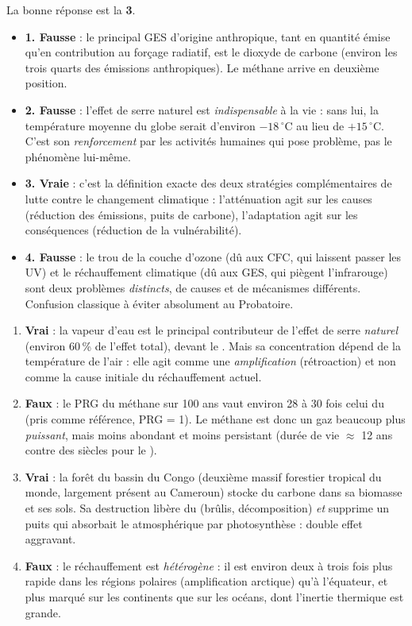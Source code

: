 \documentclass[11pt]{article}
\newcommand{\cle}[1]{{\popxbold\color{popdark}#1}}
\begin{document}
\begin{corrige}
La bonne réponse est la \textbf{3}.
\begin{itemize}
    \item \textbf{1. Fausse} : le principal GES d'origine anthropique, tant en quantité émise qu'en contribution au forçage radiatif, est le dioxyde de carbone  (environ les trois quarts des émissions anthropiques). Le méthane  arrive en deuxième position.
    \item \textbf{2. Fausse} : l'effet de serre naturel est \emph{indispensable} à la vie : sans lui, la température moyenne du globe serait d'environ $-18\,^\circ$C au lieu de $+15\,^\circ$C. C'est son \emph{renforcement} par les activités humaines qui pose problème, pas le phénomène lui-même.
    \item \textbf{3. Vraie} : c'est la définition exacte des deux stratégies complémentaires de lutte contre le changement climatique : l'\cle{atténuation} agit sur les causes (réduction des émissions, puits de carbone), l'\cle{adaptation} agit sur les conséquences (réduction de la vulnérabilité).
    \item \textbf{4. Fausse} : le trou de la couche d'ozone (dû aux CFC, qui laissent passer les UV) et le réchauffement climatique (dû aux GES, qui piègent l'infrarouge) sont deux problèmes \emph{distincts}, de causes et de mécanismes différents. Confusion classique à éviter absolument au Probatoire.
\end{itemize}
\end{corrige}

\begin{corrige}
\begin{enumerate}
    \item \textbf{Vrai} : la vapeur d'eau est le principal contributeur de l'effet de serre \emph{naturel} (environ 60\,\% de l'effet total), devant le . Mais sa concentration dépend de la température de l'air : elle agit comme une \emph{amplification} (rétroaction) et non comme la cause initiale du réchauffement actuel.
    \item \textbf{Faux} : le PRG du méthane sur 100 ans vaut environ 28 à 30 fois celui du  (pris comme référence, PRG = 1). Le méthane est donc un gaz beaucoup plus \emph{puissant}, mais moins abondant et moins persistant (durée de vie $\approx$ 12 ans contre des siècles pour le ).
    \item \textbf{Vrai} : la forêt du bassin du Congo (deuxième massif forestier tropical du monde, largement présent au Cameroun) stocke du carbone dans sa biomasse et ses sols. Sa destruction libère du  (brûlis, décomposition) \emph{et} supprime un puits qui absorbait le  atmosphérique par photosynthèse : double effet aggravant.
    \item \textbf{Faux} : le réchauffement est \emph{hétérogène} : il est environ deux à trois fois plus rapide dans les régions polaires (amplification arctique) qu'à l'équateur, et plus marqué sur les continents que sur les océans, dont l'inertie thermique est grande.
\end{enumerate}
\end{corrige}
\end{document}

